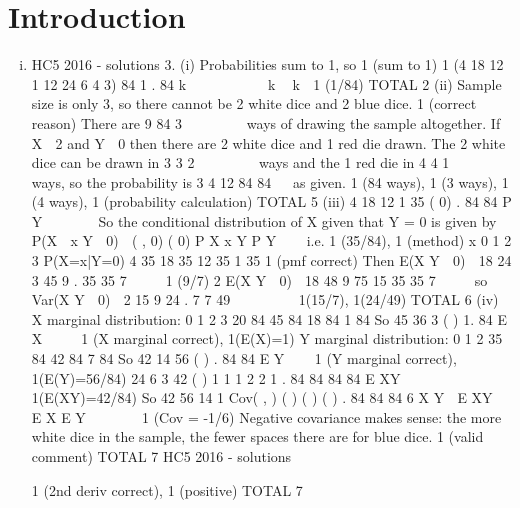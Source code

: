 \documentclass{article}
\author{kobriendublin }
\date{December 2018}
\begin{document}
\section{Introduction}
\begin{enumerate}[(i)]
\item
HC5 2016 - solutions
3. (i) Probabilities sum to 1, so 1 (sum to 1)
1
(4 18 12 1 12 24 6 4 3) 84 1 .
84
k          k  k  1 (1/84)
TOTAL 2
(ii) Sample size is only 3, so there cannot be 2 white dice and 2 blue dice. 1 (correct reason)
There are
9
84
3
 
  
 
ways of drawing the sample altogether. If X  2 and Y  0 then there
are 2 white dice and 1 red die drawn. The 2 white dice can be drawn in
3
3
2
 
  
 
ways and the
1 red die in
4
4
1
 
  
 
ways, so the probability is
3 4 12
84 84

 as given.
1 (84 ways), 1 (3 ways), 1 (4 ways), 1 (probability calculation)
TOTAL 5
(iii)
4 18 12 1 35
( 0) .
84 84
P Y
  
   So the conditional distribution of X given that Y = 0 is
given by P(X  x Y  0) 
( , 0)
( 0)
P X x Y
P Y
 

i.e. 1 (35/84), 1 (method)
x 0 1 2 3
P(X=x|Y=0) 4
35
18
35
12
35
1
35 1 (pmf correct)
Then E(X Y  0) 
18 24 3 45 9
.
35 35 7
 
  1 (9/7)
2 E(X Y  0) 
18 48 9 75 15
35 35 7
 
  so Var(X Y  0) 
2
15 9 24
.
7 7 49
 
  
 
1(15/7), 1(24/49)
TOTAL 6
(iv) X marginal distribution: 0 1 2 3
20
84
45
84
18
84
1
84
So
45 36 3
( ) 1.
84
E X
 
 
1 (X marginal correct), 1(E(X)=1)
Y marginal distribution: 0 1 2
35
84
42
84
7
84
So
42 14 56
( ) .
84 84
E Y

 
1 (Y marginal correct), 1(E(Y)=56/84)
24 6 3 42
( ) 1 1 1 2 2 1 .
84 84 84 84
E XY           1(E(XY)=42/84)
So
42 56 14 1
Cov( , ) ( ) ( ) ( ) .
84 84 84 6
X Y  E XY  E X E Y       1 (Cov = -1/6)
Negative covariance makes sense: the more white dice in the sample, the fewer spaces there
are for blue dice. 1 (valid comment)
TOTAL 7
HC5 2016 - solutions

1 (2nd deriv correct), 1 (positive)
TOTAL 7\end{enumerate}
\end{document}
